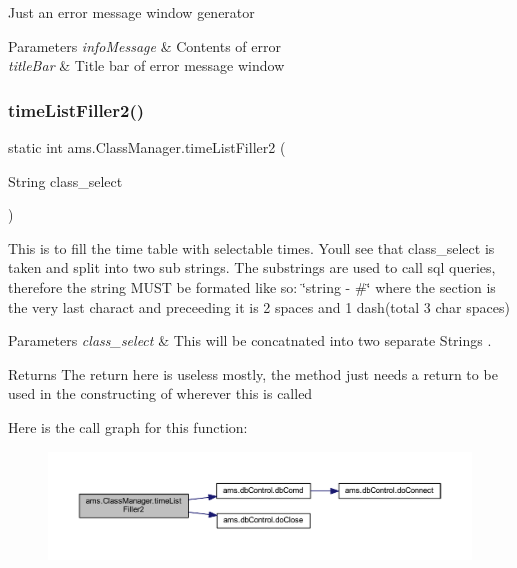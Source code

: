 Just an error message window generator 
\begin{DoxyParams}{Parameters}
{\em info\+Message} & Contents of error \\
\hline
{\em title\+Bar} & Title bar of error message window \\
\hline
\end{DoxyParams}
\mbox{\label{classams_1_1_class_manager_a14992ccf08396a727940200ec421d4f1}} 
\subsubsection{\texorpdfstring{timeListFiller2()}{timeListFiller2()}}
{\footnotesize\ttfamily static int ams.\+Class\+Manager.\+time\+List\+Filler2 (\begin{DoxyParamCaption}\item[{String}]{class\+\_\+select }\end{DoxyParamCaption})\hspace{0.3cm}{\ttfamily [static]}}

This is to fill the time table with selectable times. You\textquotesingle{}ll see that class\+\_\+select is taken and split into two sub strings. The substrings are used to call sql queries, therefore the string M\+U\+ST be formated like so\+: \char`\"{}string -\/ \#\char`\"{} where the section is the very last charact and preceeding it is 2 spaces and 1 dash(total 3 char spaces) 
\begin{DoxyParams}{Parameters}
{\em class\+\_\+select} & This will be concatnated into two separate Strings . \\
\hline
\end{DoxyParams}
\begin{DoxyReturn}{Returns}
The return here is useless mostly, the method just needs a return to be used in the constructing of wherever this is called 
\end{DoxyReturn}
Here is the call graph for this function\+:\nopagebreak
\begin{figure}[H]
\begin{center}
\leavevmode
\includegraphics[width=350pt]{classams_1_1_class_manager_a14992ccf08396a727940200ec421d4f1_cgraph}
\end{center}
\end{figure}
\mbox{\label{classams_1_1_class_manager_a58654d39f62f9d5c11d8967c0fef3059}} 
